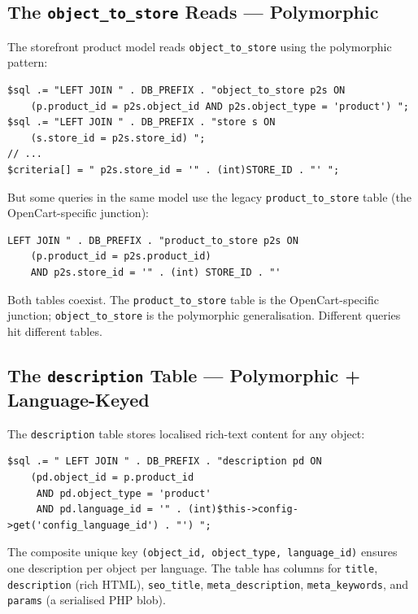 \documentclass[11pt,a4paper]{article}
\begin{document}
\subsection{The \texttt{object\_to\_store} Reads --- Polymorphic}

The storefront product model reads \texttt{object\_to\_store} using
the polymorphic pattern:

\begin{lstlisting}[caption={Storefront product model: polymorphic \texttt{object\_to\_store} read.},label={lst:o2s-read}]
$sql .= "LEFT JOIN " . DB_PREFIX . "object_to_store p2s ON
    (p.product_id = p2s.object_id AND p2s.object_type = 'product') ";
$sql .= "LEFT JOIN " . DB_PREFIX . "store s ON
    (s.store_id = p2s.store_id) ";
// ...
$criteria[] = " p2s.store_id = '" . (int)STORE_ID . "' ";
\end{lstlisting}

But some queries in the same model use the legacy
\texttt{product\_to\_store} table (the OpenCart-specific junction):

\begin{lstlisting}[caption={Storefront product model: legacy \texttt{product\_to\_store} read (coexists).},label={lst:p2s-read}]
LEFT JOIN " . DB_PREFIX . "product_to_store p2s ON
    (p.product_id = p2s.product_id)
    AND p2s.store_id = '" . (int) STORE_ID . "'
\end{lstlisting}

Both tables coexist. The \texttt{product\_to\_store} table is the
OpenCart-specific junction; \texttt{object\_to\_store} is the
polymorphic generalisation. Different queries hit different tables.

\subsection{The \texttt{description} Table --- Polymorphic + Language-Keyed}

The \texttt{description} table stores localised rich-text content for
any object:

\begin{lstlisting}[caption={Storefront product model: \texttt{description} join.},label={lst:desc-read}]
$sql .= " LEFT JOIN " . DB_PREFIX . "description pd ON
    (pd.object_id = p.product_id
     AND pd.object_type = 'product'
     AND pd.language_id = '" . (int)$this->config->get('config_language_id') . "') ";
\end{lstlisting}

The composite unique key \texttt{(object\_id, object\_type,
language\_id)} ensures one description per object per language. The
table has columns for \texttt{title}, \texttt{description} (rich HTML),
\texttt{seo\_title}, \texttt{meta\_description},
\texttt{meta\_keywords}, and \texttt{params} (a serialised PHP blob).
\end{document}
